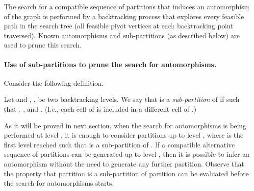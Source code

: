The search for a compatible sequence of partitions that induces an automorphism of the graph is performed by a backtracking process that explores every feasible path in the search tree (all feasible pivot vertices at each backtracking point traversed). Known automorphisms and sub-partitions (as described below) are used to prune this search.

\paragraph{Use of sub-partitions to prune the search for automorphisms.} Consider the following definition.
\begin{definition}
\label{subpartition-def}
Let  and , , be two backtracking levels. We say that  is a \emph{sub-partition} of  if  such that , , and . (I.e., each cell of  is included in a different cell of .)
\end{definition}
As it will be proved in next section, when the search for automorphisms is being performed at level , it is enough to consider partitions up to level , where  is the first level reached such that  is a sub-partition of . If a compatible alternative sequence of partitions can be generated up to level , then it is possible to infer an automorphism without the need to generate any further partition. Observe that the property that partition  is a sub-partition of partition  can be evaluated before the search for automorphisms starts.

